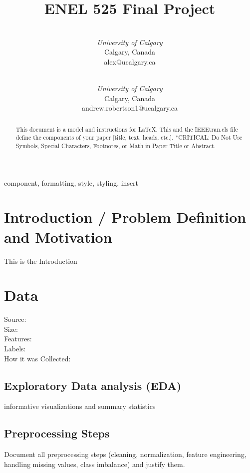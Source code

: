 \documentclass[conference]{IEEEtran}
\begin{document}
\title{ENEL 525 Final Project}

\author{
 \\
\textit{University of Calgary}\\
Calgary, Canada \\
alex@ucalgary.ca
\and
{}
 \\
\textit{University of Calgary}\\
Calgary, Canada \\
andrew.robertson1@ucalgary.ca}

\maketitle

\begin{abstract}
This document is a model and instructions for \LaTeX.
This and the IEEEtran.cls file define the components of your paper [title, text, heads, etc.]. *CRITICAL: Do Not Use Symbols, Special Characters, Footnotes, 
or Math in Paper Title or Abstract.
\end{abstract}

\begin{IEEEkeywords}
component, formatting, style, styling, insert
\end{IEEEkeywords} %

\section{Introduction / Problem Definition and Motivation}
This is the Introduction

\section{Data}
Source: \\
Size: \\
Features: \\
Labels: \\
How it was Collected:

\subsection{Exploratory Data analysis (EDA)}
informative visualizations and summary statistics

\subsection{Preprocessing Steps}
Document all preprocessing steps (cleaning, normalization, feature engineering, handling missing
values, class imbalance) and justify them.
\end{document}
